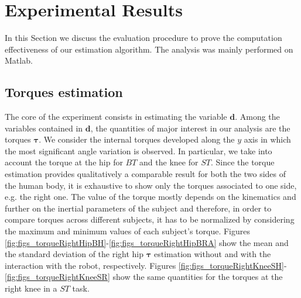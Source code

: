 
\section{Experimental Results}
%
In this Section we discuss the evaluation procedure to prove the computation effectiveness of
 our estimation algorithm. The analysis was mainly performed on Matlab. 
%
\subsection{Torques estimation}
The core of the experiment consists in estimating the
 variable $\bm d$.  Among the variables contained in $\bm d$, the quantities of major 
 interest in our analysis are 
 the torques $\bm{\tau}$. We consider the internal
 torques developed along the $y$ axis in which the most significant angle variation is observed. 
In particular, we take into account the torque at the hip for $BT$ and the knee for $ST$. Since
 the torque estimation provides qualitatively a comparable result for both the two sides of 
 the human body, it is exhaustive to show only the torques associated to one side, e.g. the
  right one.
The value of the torque mostly depends on the kinematics and further on the 
inertial parameters of the subject and therefore, in order to compare torques across different subjects,
 it has to be normalized by considering the maximum and minimum values of each 
 subject's torque. 
Figures \ref{fig:figs_torqueRightHipBH}-\ref{fig:figs_torqueRightHipBRA} show the mean 
and the standard deviation of the right hip $\bm{\tau}$ estimation  without and 
with the interaction with the robot, respectively.  Figures \ref{fig:figs_torqueRightKneeSH}-\ref{fig:figs_torqueRightKneeSR} show the same 
quantities for the torques at the right knee in a $ST$ task.
%
